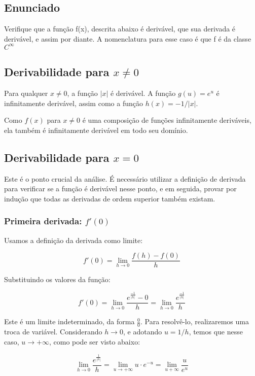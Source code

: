 

\subsection{Enunciado}

Verifique que a função f(x), descrita abaixo é derivável, que sua derivada é derivável, e assim por
diante. A nomenclatura para esse caso é que f é da classe $C^\infty$

\subsection{Derivabilidade para $x \neq 0$}

Para qualquer $x \neq 0$, a função $|x|$ é derivável. A função $g(u) = e^u$ é infinitamente derivável,
assim como a função $h(x) = -1/|x|$.

Como $f(x)$ para $x \neq 0$ é uma composição de funções infinitamente deriváveis, ela também é infinitamente
derivável em todo seu domínio.

\subsection{Derivabilidade para $x = 0$}

Este é o ponto crucial da análise. É necessário utilizar a definição de derivada para verificar se
a função é derivável nesse ponto, e em seguida, provar por indução que todas as derivadas de ordem superior
também existam.

\subsubsection{Primeira derivada: $f'(0)$}

Usamos a definição da derivada como limite:

\[f'(0) = \lim_{h\to0} \frac{f(h) - f(0)}{h}\]

Substituindo os valores da função:

\[f'(0) = \lim_{h\to0} \frac{e^{\frac{-1}{|h|}} - 0}{h} = \lim_{h\to0} \frac{e^{\frac{-1}{|h|}}}{h}\]

Este é um limite indeterminado, da forma $\frac{0}{0}$. Para resolvê-lo, realizaremos uma troca de variável.
Considerando $h\to0$, e adotando $u = 1/h$, temos que nesse caso, $u\to+\infty$, como pode ser visto abaixo:

\[\lim_{h\to0} \frac{e^{\frac{1}{|h|}}}{h} = \lim_{u\to+\infty} u\cdot e^{-u} = \lim_{u+\infty}\frac{u}{e^u}\]

